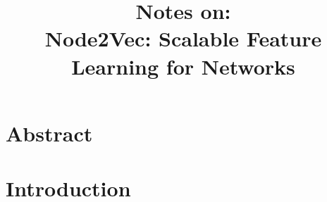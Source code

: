 \documentclass{article}
\title{\textbf{Notes on:}\\ Node2Vec: Scalable Feature Learning for Networks}
\begin{document}
\maketitle{}

\section{Abstract}

\section{Introduction}
\end{document}
